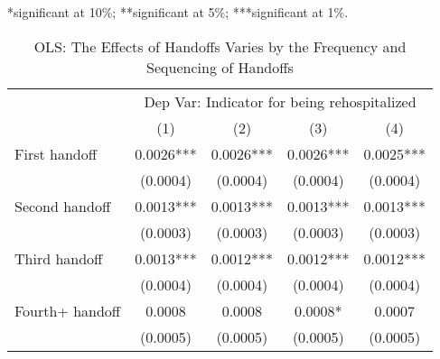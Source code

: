 \documentclass[final,12pt, notitlepage]{article}
\begin{document}
\begin{singlespace}
\begin{table}[H]
\begin{threeparttable}
\begin{tablenotes}
	*significant at 10\%; **significant at 5\%; ***significant at 1\%.
	\end{tablenotes}
\end{threeparttable}
\end{table}




\begin{table}[H]
\footnotesize
\setlength\tabcolsep{0pt}
\centering
\caption{OLS: The Effects of Handoffs Varies by the Frequency and Sequencing of Handoffs}
\label{tab:ols_mechanism}
\begin{threeparttable}
\begin{tabular*}{\textwidth}{l@{\extracolsep{\fill}}*{4}{c}} %
\toprule
& \multicolumn{4}{c}{Dep Var: Indicator for being rehospitalized} \\
 & (1) & (2) & (3) & (4) \\
\midrule
First handoff & 0.0026*** & 0.0026*** & 0.0026*** & 0.0025*** \\
 & (0.0004) & (0.0004) & (0.0004) & (0.0004) \\
Second handoff & 0.0013*** & 0.0013*** & 0.0013*** & 0.0013*** \\
 & (0.0003) & (0.0003) & (0.0003) & (0.0003) \\
Third handoff & 0.0013*** & 0.0012*** & 0.0012*** & 0.0012*** \\
 & (0.0004) & (0.0004) & (0.0004) & (0.0004) \\
Fourth+ handoff & 0.0008 & 0.0008 & 0.0008* & 0.0007 \\
 & (0.0005) & (0.0005) & (0.0005) & (0.0005) \\

\end{tabular*}
\end{threeparttable}
\end{table}
\end{singlespace}
\end{document}

